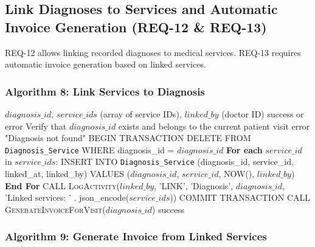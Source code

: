 \subsection{Link Diagnoses to Services and Automatic Invoice Generation (REQ-12 \& REQ-13)}

REQ-12 allows linking recorded diagnoses to medical services. REQ-13 requires automatic invoice generation based on linked services.

\subsubsection{Algorithm 8: Link Services to Diagnosis}

\begin{algorithm}[H]
	\caption{Link Medical Services to Diagnosis}
	\label{alg:link-services-diagnosis}
	\begin{algorithmic}[1]
		\REQUIRE $diagnosis\_id$, $service\_ids$ (array of service IDs), $linked\_by$ (doctor ID)
		\ENSURE success or error
		\STATE Verify that $diagnosis\_id$ exists and belongs to the current patient visit
		\RETURN error "Diagnosis not found"
		\ENDIF
		\STATE BEGIN TRANSACTION
		\STATE DELETE FROM \texttt{Diagnosis\_Service} WHERE diagnosis\_id = $diagnosis\_id$
		\STATE \textbf{For each} $service\_id$ in $service\_ids$:
		\STATE \quad INSERT INTO \texttt{Diagnosis\_Service} (diagnosis\_id, service\_id, linked\_at, linked\_by)
		VALUES ($diagnosis\_id$, $service\_id$, NOW(), $linked\_by$)
		\STATE \textbf{End For}
		\STATE CALL \textsc{LogActivity}($linked\_by$, 'LINK', 'Diagnosis', $diagnosis\_id$, 
		'Linked services: ' . json\_encode($service\_ids$))
		\STATE COMMIT TRANSACTION
		\STATE CALL \textsc{GenerateInvoiceForVisit}($diagnosis\_id$)
		\RETURN success
	\end{algorithmic}
\end{algorithm}

\subsubsection{Algorithm 9: Generate Invoice from Linked Services}


